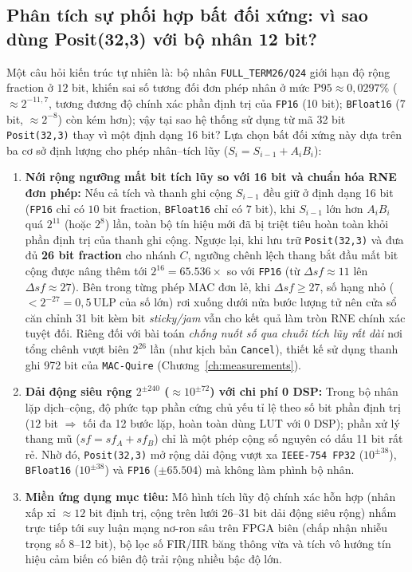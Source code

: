 \subsection*{Phân tích sự phối hợp bất đối xứng: vì sao dùng Posit(32,3) với bộ nhân 12 bit?}
Một câu hỏi kiến trúc tự nhiên là: bộ nhân \texttt{FULL\_TERM26/Q24} giới hạn độ
rộng fraction ở $12$ bit, khiến sai số tương đối đơn phép nhân ở mức
$\mathrm{P95}\approx 0{,}0297\%$ ($\approx 2^{-11{,}7}$, tương đương độ chính xác
phần định trị của \texttt{FP16} (10 bit); \texttt{BFloat16} (7 bit, $\approx 2^{-8}$)
còn kém hơn); vậy tại sao
hệ thống sử dụng từ mã 32 bit \texttt{Posit(32,3)} thay vì một định dạng 16 bit?
Lựa chọn bất đối xứng này dựa trên ba cơ sở định lượng cho phép nhân--tích lũy
($S_i = S_{i-1} + A_i B_i$):
\begin{enumerate}
  \item \textbf{Nới rộng ngưỡng mất bit tích lũy so với 16 bit và chuẩn hóa RNE đơn phép:}
        Nếu cả tích và thanh ghi cộng $S_{i-1}$ đều giữ ở định dạng 16 bit
        (\texttt{FP16} chỉ có $10$ bit fraction, \texttt{BFloat16} chỉ có $7$ bit),
        khi $S_{i-1}$ lớn hơn $A_i B_i$ quá $2^{11}$ (hoặc $2^8$) lần, toàn bộ
        tín hiệu mới đã bị triệt tiêu hoàn toàn khỏi phần định trị của thanh ghi
        cộng. Ngược lại, khi lưu trữ \texttt{Posit(32,3)} và đưa đủ \textbf{26 bit
        fraction} cho nhánh $C$, ngưỡng chênh lệch thang bắt đầu mất bit cộng
        được nâng thêm tới $2^{16} = 65.536\times$ so với \texttt{FP16} (từ $\Delta sf \approx 11$
        lên $\Delta sf \approx 27$). Bên trong từng phép MAC đơn lẻ, khi $\Delta sf \ge 27$,
        số hạng nhỏ ($< 2^{-27} = 0{,}5\,\mathrm{ULP}$ của số lớn) rơi xuống dưới
        nửa bước lượng tử nên cửa sổ căn chỉnh 31 bit kèm bit \textit{sticky/jam}
        vẫn cho kết quả làm tròn RNE chính xác tuyệt đối. Riêng đối với bài toán
        \emph{chống nuốt số qua chuỗi tích lũy rất dài} nơi tổng chênh vượt biên
        $2^{26}$ lần (như kịch bản \texttt{Cancel}), thiết kế sử dụng thanh ghi
        972 bit của \texttt{MAC-Quire} (Chương~\ref{ch:measurements}).
  \item \textbf{Dải động siêu rộng $2^{\pm 240}$ ($\approx 10^{\pm 72}$) với chi phí 0 DSP:}
        Trong bộ nhân lặp dịch--cộng, độ phức tạp phần cứng chủ yếu tỉ lệ theo số
        bit phần định trị ($12$ bit $\Rightarrow$ tối đa 12 bước lặp, hoàn toàn dùng
        LUT với $0\text{ DSP}$); phần xử lý thang mũ ($sf = sf_A + sf_B$) chỉ là
        một phép cộng số nguyên có dấu 11 bit rất rẻ. Nhờ đó, \texttt{Posit(32,3)}
        mở rộng dải động vượt xa \texttt{IEEE-754 FP32} ($10^{\pm 38}$), \texttt{BFloat16}
        ($10^{\pm 38}$) và \texttt{FP16} ($\pm 65.504$) mà không làm phình bộ nhân.
  \item \textbf{Miền ứng dụng mục tiêu:} Mô hình tích lũy độ chính xác hỗn hợp
        (nhân xấp xỉ $\approx 12$ bit định trị, cộng trên lưới 26--31 bit dải
        động siêu rộng) nhắm trực tiếp tới suy luận mạng nơ-ron sâu trên FPGA biên
        (chấp nhận nhiễu trọng số 8--12 bit), bộ lọc số FIR/IIR băng thông vừa và
        tích vô hướng tín hiệu cảm biến có biên độ trải rộng nhiều bậc độ lớn.
\end{enumerate}

